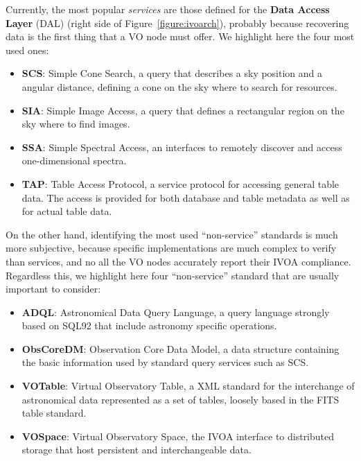 Currently, the most popular \emph{services} are those defined for
the \textbf{Data Access Layer} (DAL) (right side of Figure~\ref{figure:ivoarch}), 
probably because recovering data is the first thing that a VO node must offer.
We highlight here the four most used ones:
\begin{itemize}
\item \textbf{SCS}: Simple Cone Search, a query that describes a sky position and a
angular distance, defining a cone on the sky where to search for resources.
\item \textbf{SIA}: Simple Image Access, a query that defines a rectangular region on
the sky where to find images.
\item \textbf{SSA}: Simple Spectral Access, an interfaces to remotely discover
and access one-dimensional spectra. 
\item \textbf{TAP}: Table Access Protocol, a service protocol for accessing
general table data. The access is provided for both database and table metadata
as well as for actual table data.
\end{itemize}

On the other hand, identifying the most used ``non-service'' standards is much
more subjective, because specific implementations are much complex to verify
than services, and no all the VO nodes accurately report their IVOA compliance. 
Regardless this, we highlight here four ``non-service'' standard that are usually important
to consider:
\begin{itemize}
\item \textbf{ADQL}: Astronomical Data Query Language, a query language strongly
based on SQL92 that include astronomy specific operations. 
\item \textbf{ObsCoreDM}: Observation Core Data Model, a data structure
containing the basic information used by standard query services such as SCS.
\item \textbf{VOTable}: Virtual Observatory Table, a XML standard for the
interchange of astronomical data represented as a set of tables, loosely based 
in the FITS table standard.
\item \textbf{VOSpace}: Virtual Observatory Space, the IVOA interface to
distributed storage that host persistent and interchangeable data.
\end{itemize}

